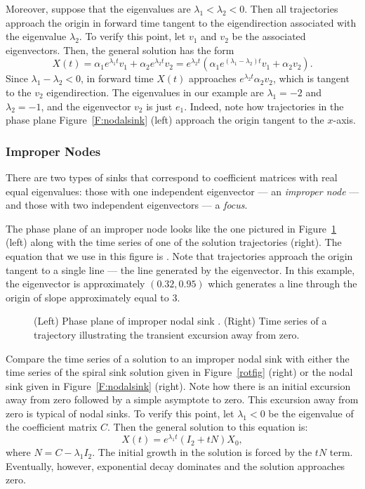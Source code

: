 \documentclass{ximera}
\begin{document}
Moreover, suppose that the eigenvalues are $\lambda_1 < \lambda_2
< 0$.  Then all trajectories approach the origin in forward time
tangent to the eigendirection associated with the eigenvalue
$\lambda_2$.   To verify this point, let $v_1$ and $v_2$ be the
associated eigenvectors.  Then, the general solution has the
form
\[
X(t) = \alpha_1e^{\lambda_1 t}v_1 + \alpha_2e^{\lambda_2 t}v_2
= e^{\lambda_2 t}(\alpha_1e^{(\lambda_1-\lambda_2)t}v_1 + \alpha_2v_2).
\]
Since $\lambda_1-\lambda_2<0$, in forward time $X(t)$ approaches
$e^{\lambda_2 t}\alpha_2v_2$, which is tangent to the $v_2$
eigendirection.  The eigenvalues in our example are $\lambda_1=-2$
and $\lambda_2=-1$, and the eigenvector $v_2$ is just $e_1$.
Indeed, note how trajectories in the phase plane  Figure~\ref{F:nodalsink}
(left) approach the origin tangent to the $x$-axis.

\subsubsection*{Improper Nodes}

There are two types of sinks that correspond to coefficient
matrices with real equal eigenvalues: those with one independent
eigenvector --- an {\em improper node\/} --- and those with two independent
eigenvectors --- a {\em focus\/}.

The phase plane
of an improper node looks like the one pictured in
Figure~\ref{F:degennodal} (left) along with the time series
of one of the solution trajectories (right).  The equation
that we use in this figure is .
Note that trajectories approach the origin tangent to a single
line --- the line generated by the eigenvector.  In this example, the
eigenvector is approximately $(0.32,0.95)$ which generates a line
through the origin of slope approximately equal to $3$.

\begin{figure}[htb]
           \centerline{%
           }
           \caption{(Left) Phase plane of improper nodal sink
	       \protect{}.  (Right) Time series of
		a trajectory illustrating the transient excursion
		away from zero.}
           \label{F:degennodal}
\end{figure}

Compare the time series of a solution to an improper nodal sink
with either the time series of the spiral sink solution given
in Figure~\ref{rotfig} (right) or the nodal sink given in
Figure~\ref{F:nodalsink} (right).  Note how there is an initial
excursion away from zero followed by a simple asymptote to zero.
This excursion away from zero is typical of nodal sinks. To verify
this point, let $\lambda_1<0$ be the eigenvalue of the coefficient
matrix $C$.  Then the general solution to this equation is:
\[
X(t) = e^{\lambda_1 t}(I_2 + tN)X_0,
\]
where $N = C-\lambda_1 I_2$.
The initial growth in the solution is forced by the $tN$ term.
Eventually, however, exponential decay dominates and the solution
approaches zero.
\end{document}
